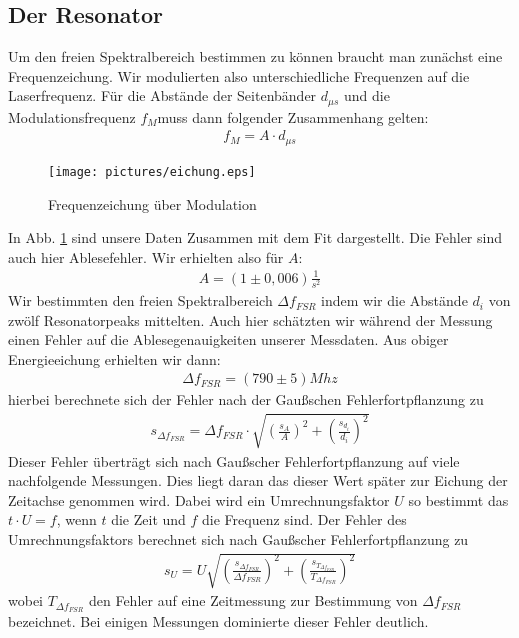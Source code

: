 \documentclass[12pt]{article}
\begin{document}
\subsection{Der Resonator}
Um den freien Spektralbereich bestimmen zu können braucht man zunächst eine Frequenzeichung. Wir modulierten also unterschiedliche Frequenzen auf die Laserfrequenz. Für die Abstände der Seitenbänder $d_{\mu s}$ und die Modulationsfrequenz $f_M$muss dann folgender Zusammenhang gelten:
\begin{align*}
 f_M = A \cdot d_{\mu s}
\end{align*} 
\begin{figure}[H]
 \texttt{[image: pictures/eichung.eps]}
 \caption{Frequenzeichung über Modulation}
 \label{eichung}
\end{figure}
In Abb. \ref{eichung} sind unsere Daten Zusammen mit dem Fit dargestellt. Die Fehler sind auch hier Ablesefehler. Wir erhielten also für $A$:
\begin{align*}
 A = (1 \pm 0,006) \frac{1}{s^2}
\end{align*} 
Wir bestimmten den freien Spektralbereich $\Delta f_{FSR}$ indem wir die Abstände $d_i$ von zwölf Resonatorpeaks mittelten. Auch hier schätzten wir während der Messung einen Fehler auf die Ablesegenauigkeiten unserer Messdaten. Aus obiger Energieeichung erhielten wir dann:
\begin{align*}
 \Delta f_{FSR} = (790\pm5) Mhz
\end{align*}
hierbei berechnete sich der Fehler nach der Gaußschen Fehlerfortpflanzung zu
\begin{align*}
 s_{\Delta f_{FSR}} = \Delta f_{FSR} \cdot \sqrt{ \left( \frac{s_A}{A} \right)^2 + \left( \frac{s_{d_i}}{d_i} \right)^2}
\end{align*}
Dieser Fehler überträgt sich nach Gaußscher Fehlerfortpflanzung auf viele nachfolgende Messungen. Dies liegt daran das dieser Wert später zur Eichung der Zeitachse genommen wird. Dabei wird ein Umrechnungsfaktor $U$ so bestimmt das $t\cdot U=f$, wenn $t$ die Zeit und $f$ die Frequenz sind. Der Fehler des Umrechnungsfaktors berechnet sich nach Gaußscher Fehlerfortpflanzung zu
\begin{align*}
 s_U = U \sqrt{ \left( \frac{s_{\Delta f_{FSR}}}{\Delta f_{FSR}} \right) ^2 + \left( \frac{s_{T_{\Delta f_{FSR}}}}{T_{\Delta f_{FSR}}} \right) ^2 }
\end{align*}
wobei $T_{\Delta f_{FSR}}$ den Fehler auf eine Zeitmessung zur Bestimmung von $\Delta f_{FSR}$ bezeichnet. Bei einigen Messungen dominierte dieser Fehler deutlich.
\end{document}
